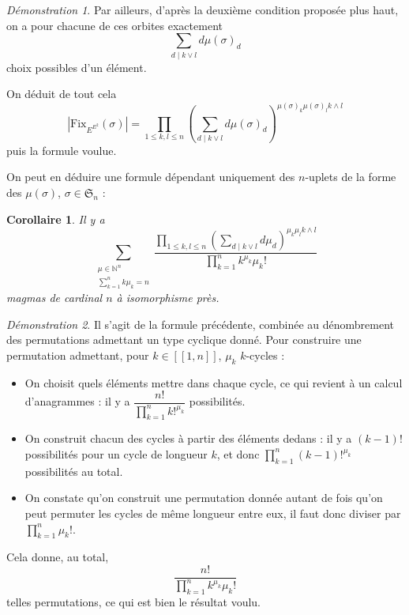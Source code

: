 \documentclass{article}
\newtheorem{corollaire}{Corollaire}
\theoremstyle{definition}
\theoremstyle{remark}
\newtheorem*{demonstration}{Démonstration}
\begin{document}
\begin{demonstration}
    Par ailleurs, d'après la deuxième condition proposée plus haut, on a pour chacune de ces orbites exactement
    $$\sum_{d\mid k\lor l}d\mu(\sigma)_d$$
    choix possibles d'un élément.

    On déduit de tout cela
    $$\left|\mathrm{Fix}_{E^{E^2}}(\sigma)\right|=\prod_{1\leq k,l\leq n}\left(\sum_{d\mid k\lor l}d\mu(\sigma)_d\right)^{\mu(\sigma)_k\mu(\sigma)_lk\land l}$$
    puis la formule voulue.
\end{demonstration}

On peut en déduire une formule dépendant uniquement des $n$-uplets de la forme des $\mu(\sigma)$, $\sigma\in\mathfrak S_n$ :

\begin{corollaire}
    Il y a
    $$\sum_{\substack{\mu\in \mathbb N^n\\\sum\limits_{k=1}^nk\mu_k=n}}\frac{\displaystyle\prod_{1\leq k,l\leq n}\left(\sum_{d\mid k\lor l}d\mu_d\right)^{\mu_k\mu_lk\land l}}{\displaystyle\prod_{k=1}^nk^{\mu_k}\mu_k!}$$
    magmas de cardinal $n$ à isomorphisme près.
\end{corollaire}

\begin{demonstration}
    Il s'agit de la formule précédente, combinée au dénombrement des permutations admettant un type cyclique donné.
    Pour construire une permutation admettant, pour $k\in[\![1,n]\!]$, $\mu_k$ $k$-cycles :
    
    \begin{itemize}
        \item On choisit quels éléments mettre dans chaque cycle, ce qui revient à un calcul d'anagrammes : il y a
        $\dfrac{n!}{\displaystyle\prod_{k=1}^nk!^{\mu_k}}$
        possibilités.
        \item On construit chacun des cycles à partir des éléments dedans : il y a $(k-1)!$ possibilités pour un cycle de longueur $k$, et donc $\displaystyle\prod_{k=1}^{n}(k-1)!^{\mu_k}$ possibilités au total.
        \item On constate qu'on construit une permutation donnée autant de fois qu'on peut permuter les cycles de même longueur entre eux, il faut donc diviser par $\displaystyle\prod_{k=1}^n\mu_k!$.
    \end{itemize}

    Cela donne, au total,
    $$\frac{n!}{\displaystyle\prod_{k=1}^nk^{\mu_k}\mu_k!}$$
    telles permutations, ce qui est bien le résultat voulu.
\end{demonstration}
\end{document}
